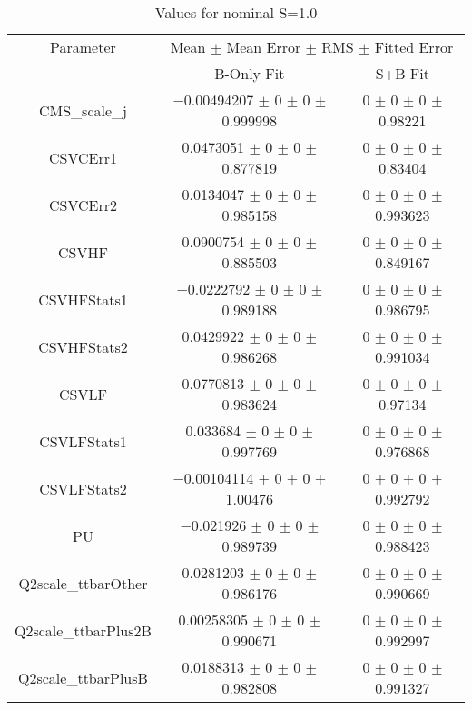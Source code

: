 \begin{table}
\centering
\caption{Values for nominal S=1.0}
\begin{tabular}{ccc}
\toprule
Parameter & \multicolumn{2}{c}{Mean $\pm$ Mean Error $\pm$ RMS $\pm$ Fitted Error}\\
 & B-Only Fit & S+B Fit\\
\midrule
CMS\_scale\_j & \num{-0.00494207} $\pm$ \num{0} $\pm$ \num{0} $\pm$ \num{0.999998} & \num{0} $\pm$ \num{0} $\pm$ \num{0} $\pm$ \num{0.98221}\\
CSVCErr1 & \num{0.0473051} $\pm$ \num{0} $\pm$ \num{0} $\pm$ \num{0.877819} & \num{0} $\pm$ \num{0} $\pm$ \num{0} $\pm$ \num{0.83404}\\
CSVCErr2 & \num{0.0134047} $\pm$ \num{0} $\pm$ \num{0} $\pm$ \num{0.985158} & \num{0} $\pm$ \num{0} $\pm$ \num{0} $\pm$ \num{0.993623}\\
CSVHF & \num{0.0900754} $\pm$ \num{0} $\pm$ \num{0} $\pm$ \num{0.885503} & \num{0} $\pm$ \num{0} $\pm$ \num{0} $\pm$ \num{0.849167}\\
CSVHFStats1 & \num{-0.0222792} $\pm$ \num{0} $\pm$ \num{0} $\pm$ \num{0.989188} & \num{0} $\pm$ \num{0} $\pm$ \num{0} $\pm$ \num{0.986795}\\
CSVHFStats2 & \num{0.0429922} $\pm$ \num{0} $\pm$ \num{0} $\pm$ \num{0.986268} & \num{0} $\pm$ \num{0} $\pm$ \num{0} $\pm$ \num{0.991034}\\
CSVLF & \num{0.0770813} $\pm$ \num{0} $\pm$ \num{0} $\pm$ \num{0.983624} & \num{0} $\pm$ \num{0} $\pm$ \num{0} $\pm$ \num{0.97134}\\
CSVLFStats1 & \num{0.033684} $\pm$ \num{0} $\pm$ \num{0} $\pm$ \num{0.997769} & \num{0} $\pm$ \num{0} $\pm$ \num{0} $\pm$ \num{0.976868}\\
CSVLFStats2 & \num{-0.00104114} $\pm$ \num{0} $\pm$ \num{0} $\pm$ \num{1.00476} & \num{0} $\pm$ \num{0} $\pm$ \num{0} $\pm$ \num{0.992792}\\
PU & \num{-0.021926} $\pm$ \num{0} $\pm$ \num{0} $\pm$ \num{0.989739} & \num{0} $\pm$ \num{0} $\pm$ \num{0} $\pm$ \num{0.988423}\\
Q2scale\_ttbarOther & \num{0.0281203} $\pm$ \num{0} $\pm$ \num{0} $\pm$ \num{0.986176} & \num{0} $\pm$ \num{0} $\pm$ \num{0} $\pm$ \num{0.990669}\\
Q2scale\_ttbarPlus2B & \num{0.00258305} $\pm$ \num{0} $\pm$ \num{0} $\pm$ \num{0.990671} & \num{0} $\pm$ \num{0} $\pm$ \num{0} $\pm$ \num{0.992997}\\
Q2scale\_ttbarPlusB & \num{0.0188313} $\pm$ \num{0} $\pm$ \num{0} $\pm$ \num{0.982808} & \num{0} $\pm$ \num{0} $\pm$ \num{0} $\pm$ \num{0.991327}\\

\end{tabular}
\end{table}
